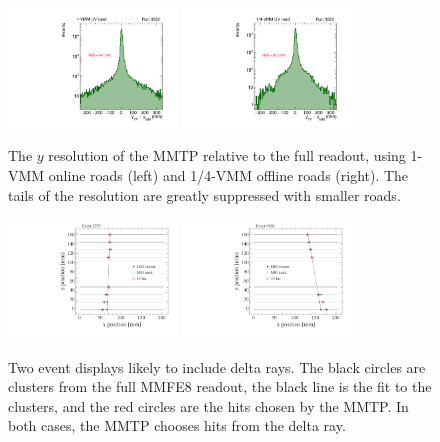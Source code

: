 \begin{figure}[!htpb]
  \begin{center}
    \includegraphics[width=0.4\textwidth]{figures/gbtanalysis3522/TP_yres_1road.pdf}
    \includegraphics[width=0.4\textwidth]{figures/gbtanalysis3522/TP_yres_smallroad.pdf}
  \end{center}
  \vspace{-10pt}
  \caption{The $y$ resolution of the MMTP relative to the full readout, using 1-VMM online roads (left) and 1/4-VMM offline roads (right). The tails of the resolution are greatly suppressed with smaller roads.}
  \label{fig:yres}
\end{figure}

\begin{figure}[!htpb]
  \begin{center}
    \includegraphics[width=0.4\textwidth]{figures/event_displays/display_02579.pdf}
    \includegraphics[width=0.4\textwidth]{figures/event_displays/display_08160.pdf}
  \end{center}
  \vspace{-10pt}
  \caption{Two event displays likely to include delta rays. The black circles are clusters from the full MMFE8 readout, the black line is the fit to the clusters, and the red circles are the hits chosen by the MMTP. In both cases, the MMTP chooses hits from the delta ray.}
  \label{fig:deltarays}
\end{figure}

